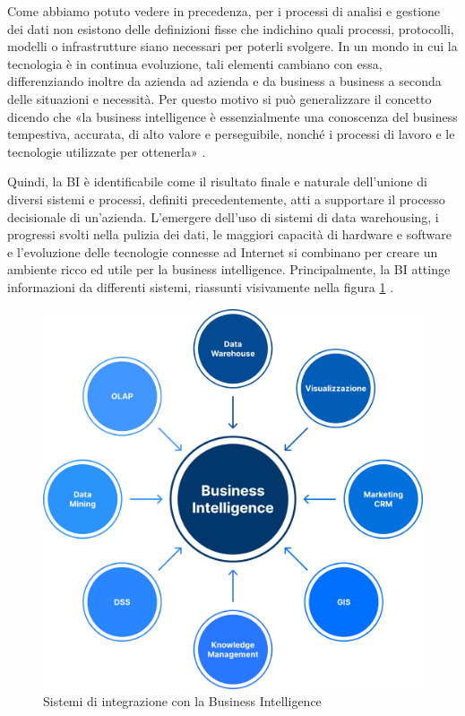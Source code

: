 Come abbiamo potuto vedere in precedenza, per i processi di analisi e gestione dei dati non esistono delle definizioni fisse che indichino quali processi, protocolli, modelli o infrastrutture siano necessari per poterli svolgere. In un mondo in cui la tecnologia è in continua evoluzione, tali elementi cambiano con essa, differenziando inoltre da azienda ad azienda e da business a business a seconda delle situazioni e necessità. Per questo motivo si può generalizzare il concetto dicendo che «la business intelligence è essenzialmente una conoscenza del business tempestiva, accurata, di alto valore e perseguibile, nonché i processi di lavoro e le tecnologie utilizzate per ottenerla» \cite{bi_for_dummies}.

Quindi, la BI è identificabile come il risultato finale e naturale dell'unione di diversi sistemi e processi, definiti precedentemente, atti a supportare il processo decisionale di un'azienda. L'emergere dell'uso di sistemi di data warehousing, i progressi svolti nella pulizia dei dati, le maggiori capacità di hardware e software e l'evoluzione delle tecnologie connesse ad Internet si combinano per creare un ambiente ricco ed utile per la business intelligence. Principalmente, la BI attinge informazioni da differenti sistemi, riassunti visivamente nella figura \ref{fig:Business Intelligence Systems} \cite{researchgate_bi_systems}.

\begin{figure}[!h]
    \centering
    \includegraphics[width=1\linewidth]{figure//capitolo_3/Business Intelligence Systems.pdf}
    \caption{Sistemi di integrazione con la Business Intelligence}
    \label{fig:Business Intelligence Systems}
\end{figure}

